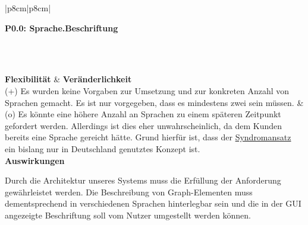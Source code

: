 \documentclass[enabledeprecatedfontcommands,fontsize=11pt,paper=a4,twoside]{scrartcl}
\newcounter{one}
\newcounter{two}[one]
\newcommand{\tone}{0\theone}
\newcommand{\two}{\stepcounter{two}0\thetwo}
\begin{document}
\begin{tabular} {|p{8cm}|p{8cm}|}
	\hline
	 {\parbox{16cm}{\textbf{\hypertarget{hh}{P\tone.\two}: Sprache.Beschriftung}} } \\  \hline\hline 
	\rule{0pt}{6ex}\\ [3ex] \hline
	\textbf{Flexibilität}  & \textbf{Veränderlichkeit} \\
	(+) Es wurden keine Vorgaben zur Umsetzung und zur konkreten Anzahl von Sprachen gemacht. Es ist nur vorgegeben, dass es mindestens zwei sein müssen. &
	(o) Es könnte eine höhere Anzahl an Sprachen zu einem späteren Zeitpunkt gefordert werden. Allerdings ist dies eher unwahrscheinlich, da dem Kunden bereits eine Sprache gereicht hätte. Grund hierfür ist, dass der \hyperlink{Syndromansatz}{Syndromansatz} ein bislang nur in Deutschland genutztes Konzept ist. \\
	\hline
	 {\textbf{Auswirkungen}} \\
	 {\parbox{16cm}{Durch die Architektur unseres Systems muss die Erfüllung der Anforderung gewährleistet werden. Die Beschreibung von Graph-Elementen muss dementsprechend in verschiedenen Sprachen hinterlegbar sein und die in der GUI angezeigte Beschriftung soll vom Nutzer umgestellt werden können. \\ } }\\ \hline
\end{tabular}

\newpage
\end{document}
